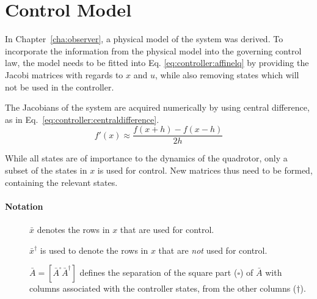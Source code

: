 \section{Control Model}
\label{sec:controller:model}
    In Chapter~\ref{cha:observer}, a physical model of the system
    was derived. To incorporate the information from the physical model
    into the governing control law, the model needs to be fitted into Eq.
    \eqref{eq:controller:affinelq} by providing the Jacobi matrices with
    regards to $x$ and $u$, while also removing states which will not be
    used in the controller.

    The Jacobians of the system are acquired numerically by using
    central difference, as in Eq.~\eqref{eq:controller:centraldifference}.
    \begin{equation}
    \label{eq:controller:centraldifference}
        f'(x) \approx \frac{f(x+h) - f(x-h)}{2h}
    \end{equation}

    While all states are of importance to the dynamics of the quadrotor,
    only a subset of the states in $x$ is used for control.
    New matrices thus need to be formed, containing the relevant states.
    \paragraph{Notation}
    \begin{description}
        \item[] $\bar{x}$ denotes the rows in $x$ that are used for control.
        \item[] $\bar{x}^{\dagger}$ is used to denote the rows in $x$ that are \textit{not} used for control.
        \item[] $\bar{A} = [ \bar{A}^{\square} \bar{A}^{\dagger}]$
        defines the separation of the square part ($\square$) of $\bar{A}$ with columns
        associated with the controller states, from the other columns ($\dagger$).
    \end{description}


